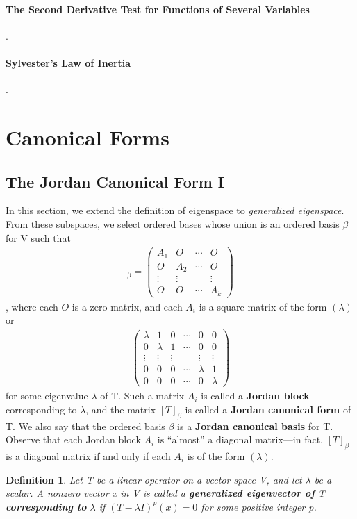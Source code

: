 \documentclass{article}
\newcommand{\bd}[1]{\textbf{#1}}
\newcommand*\bpmat[0]{\begin{pmatrix}}
\newcommand*\epmat[0]{\end{pmatrix}}
\theoremstyle{plain}
\newtheorem*{definition1}{Definition}
\theoremstyle{plain} %
\begin{document}
\paragraph{The Second Derivative Test for Functions of Several Variables} .

\paragraph{Sylvester’s Law of Inertia} .

\section{Canonical Forms}

\subsection{The Jordan Canonical Form I}

In this section, we extend the definition of eigenspace to \textit{generalized eigenspace}. From these subspaces, we select ordered bases whose union is an ordered basis $\beta$ for V such that
\begin{align*}
  [T]_\beta = \bpmat A_1&O&\cdots&O\\O&A_2&\cdots&O\\\vdots&\vdots&&\vdots\\O&O&\cdots&A_k\epmat
\end{align*}
, where each $O$ is a zero matrix, and each $A_i$ is a square matrix of the form $(\lambda)$ or
\begin{align*}
  \bpmat \lambda&1&0&\cdots&0&0\\0&\lambda&1&\cdots&0&0\\\vdots&\vdots&\vdots&&\vdots&\vdots\\0&0&0&\cdots&\lambda&1\\0&0&0&\cdots&0&\lambda\epmat
\end{align*}
for some eigenvalue $\lambda$ of T. Such a matrix $A_i$ is called a \bd{Jordan block} corresponding to $\lambda$, and the matrix $[T]_\beta$ is called a \bd{Jordan canonical form} of T. We also say that the ordered basis $\beta$ is a \bd{Jordan canonical basis} for T. Observe that each Jordan block $A_i$ is “almost” a diagonal matrix—in fact, $[T]_\beta$ is a diagonal matrix if and only if each $A_i$ is of the form $(\lambda)$.

\begin{definition1}
  Let T be a linear operator on a vector space V, and let $\lambda$ be a scalar. A nonzero vector x in V is called a \bd{generalized eigenvector of} T \bd{corresponding to} $\lambda$ if $(T − \lambda I)^p(x) = 0$ for some positive integer p.
\end{definition1}
\end{document}
